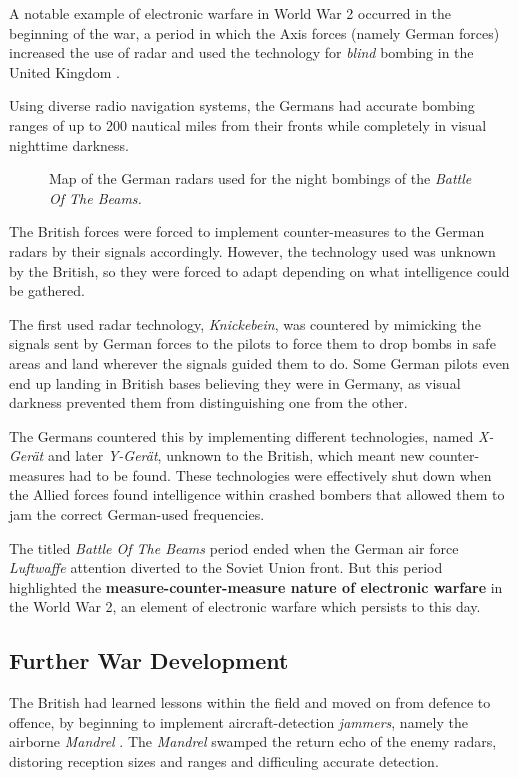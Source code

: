 \documentclass[english,purist]{ist-report}
\begin{document}
A notable example of electronic warfare in World War 2 occurred in the beginning of the war, a period in which the Axis forces (namely German forces) increased the use of radar and used the technology for \textit{blind} bombing in the United Kingdom \cite{wizardwar}.

Using diverse radio navigation systems, the Germans had accurate bombing ranges of up to 200 nautical miles from their fronts while completely in visual nighttime darkness.
\begin{figure}[ht]
    \centering
    \caption{Map of the German radars used for the night bombings of the \textit{Battle Of The Beams.}}
    \label{fig:botb_map}
\end{figure}

The British forces were forced to implement counter-measures to the German radars by \jamming{} their signals accordingly. However, the technology used was unknown by the British, so they were forced to adapt depending on what intelligence could be gathered.

The first used radar technology, \textit{Knickebein}, was countered by mimicking the signals sent by German forces to the pilots to force them to drop bombs in safe areas and land wherever the signals guided them to do. Some German pilots even end up landing in British bases believing they were in Germany, as visual darkness prevented them from distinguishing one from the other.

The Germans countered this by implementing different technologies, named \textit{X-Gerät} and later \textit{Y-Gerät}, unknown to the British, which meant new counter-measures had to be found. These technologies were effectively shut down when the Allied forces found intelligence within crashed bombers that allowed them to jam the correct German-used frequencies.

The titled \textit{Battle Of The Beams} period ended when the German air force \textit{Luftwaffe} attention diverted to the Soviet Union front. But this period highlighted the \textbf{measure-counter-measure nature of electronic warfare} in the World War 2, an element of electronic warfare which persists to this day.

\subsection{Further War Development}

The British had learned lessons within the field and moved on from defence to offence, by beginning to implement aircraft-detection \textit{jammers}, namely the airborne \textit{Mandrel} \cite{alican2006}. The \textit{Mandrel} swamped the return echo of the enemy radars, distoring reception sizes and ranges and difficuling accurate detection.
\end{document}
